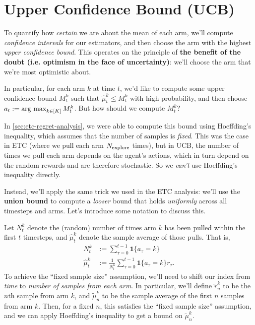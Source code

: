 \documentclass[\main/main]{subfiles}
\begin{document}
\section{Upper Confidence Bound (UCB)}

To quantify how \emph{certain} we are about the mean of each arm, we'll compute \emph{confidence intervals} for our estimators, and then choose the arm with the highest \emph{upper confidence bound}. This operates on the principle of \textbf{the benefit of the doubt (i.e. optimism in the face of uncertainty)}: we'll choose the arm that we're most optimistic about.

In particular, for each arm $k$ at time $t$, we'd like to compute some upper confidence bound $M^k_t$ such that $\hat \mu^k_t \le M^k_t$ with high probability, and then choose $a_t := \operatorname*{\textrm{arg\ max}}_{k \in [K]} M^k_t$. But how should we compute $M^k_t$?

In \autoref{sec:etc-regret-analysis}, we were able to compute this bound using Hoeffding's inequality, which assumes that the number of samples is \emph{fixed}. This was the case in ETC (where we pull each arm $N_{\text{explore}}$ times), but in UCB, the number of times we pull each arm depends on the agent's actions, which in turn depend on the random rewards and are therefore stochastic. So we \emph{can't} use Hoeffding's inequality directly.

Instead, we'll apply the same trick we used in the ETC analysis: we'll use the \textbf{union bound} to compute a \emph{looser} bound that holds \emph{uniformly} across all timesteps and arms. Let's introduce some notation to discuss this.

Let $N^k_t$ denote the (random) number of times arm $k$ has been pulled within the first $t$ timesteps, and $\hat \mu^k_t$ denote the sample average of those pulls. That is,
\begin{align*}
    N^k_t        & := \sum_{\tau=0}^{t-1} \mathbf{1} \{ a_\tau = k \}                         \\
    \hat \mu^k_t & := \frac{1}{N^k_t} \sum_{\tau=0}^{t-1} \mathbf{1} \{ a_\tau = k \} r_\tau.
\end{align*}
To achieve the ``fixed sample size'' assumption, we'll need to shift our index from \emph{time} to \emph{number of samples from each arm}. In particular, we'll define $\tilde r^k_n$ to be the $n$th sample from arm $k$, and $\tilde \mu^k_n$ to be the sample average of the first $n$ samples from arm $k$. Then, for a fixed $n$, this satisfies the ``fixed sample size'' assumption, and we can apply Hoeffding's inequality to get a bound on $\tilde \mu^k_n$.
\end{document}

